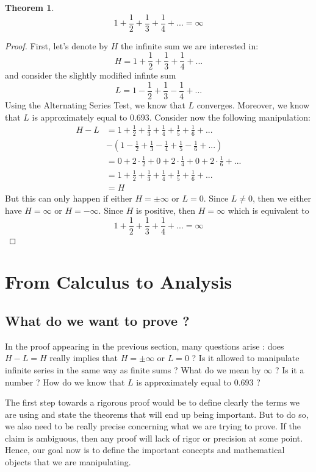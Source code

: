 \documentclass[10pt]{article}
\theoremstyle{definition}
\newtheorem*{theorem}{Theorem}
\begin{document}
\begin{theorem}
    $$ 1 + \frac{1}{2} + \frac{1}{3} + \frac{1}{4} + ... = \infty$$
\end{theorem}

\begin{proof}
    First, let's denote by $H$ the infinite sum we are interested in:
    $$H = 1 + \frac{1}{2} + \frac{1}{3} + \frac{1}{4} + ...$$
    and consider the slightly modified infinte sum
    $$L = 1 - \frac{1}{2} + \frac{1}{3} - \frac{1}{4} + ...$$
    Using the Alternating Series Test, we know that $L$ converges. Moreover, we know that $L$ is approximately equal to 0.693. Consider now the following manipulation:
    \begin{align*}
        H - L &= 1 + \frac{1}{2} + \frac{1}{3} + \frac{1}{4} + \frac{1}{5} + \frac{1}{6} + ... \\
        & - \left(1 - \frac{1}{2} + \frac{1}{3} - \frac{1}{4} + \frac{1}{5} - \frac{1}{6} + ...\right) \\
        &= 0 + 2\cdot \frac{1}{2} + 0 + 2\cdot \frac{1}{4} + 0 + 2\cdot \frac{1}{6} + ... \\
        &= 1 + \frac{1}{2} + \frac{1}{3} + \frac{1}{4} + \frac{1}{5} + \frac{1}{6} + ... \\
        &= H
    \end{align*}
    But this can only happen if either $H = \pm \infty$ or $L = 0$. Since $L \neq 0$, then we either have $H = \infty$ or $H = -\infty$. Since $H$ is positive, then $H = \infty$ which is equivalent to
    $$ 1 + \frac{1}{2} + \frac{1}{3} + \frac{1}{4} + ... = \infty$$
\end{proof}

\section{From Calculus to Analysis}

\subsection{What do we want to prove ?}

In the proof appearing in the previous section, many questions arise : does $H - L = H$ really implies that $H = \pm \infty$ or $L = 0$ ? Is it allowed to manipulate infinite series in the same way as finite sums ? What do we mean by $\infty$ ? Is it a number ? How do we know that $L$ is approximately equal to 0.693 ? 

The first step towards a rigorous proof would be to define clearly the terms we are using and state the theorems that will end up being important. But to do so, we also need to be really precise concerning what we are trying to prove. If the claim is ambiguous, then any proof will lack of rigor or precision at some point. Hence, our goal now is to define the important concepts and mathematical objects that we are manipulating.
\end{document}
